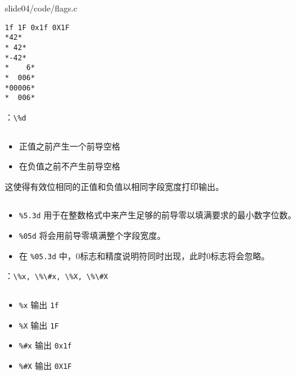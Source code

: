 \begin{frame}[fragile]\ft{\secname}
  
  {slide04/code/flags.c}    
\end{frame}

\begin{frame}[fragile]
\begin{lstlisting}[showspaces=true]
1f 1F 0x1f 0X1F
*42*
* 42*
*-42*
*    6*
*  006*
*00006*
*  006*
\end{lstlisting}
\end{frame}


\begin{frame}[fragile]{\secname：\lstinline|\%d|}

\begin{lstlisting}[backgroundcolor=\color{red!20},showspaces=true] 
% d  
\end{lstlisting}    
    \begin{itemize}
    \item 正值之前产生一个前导空格\\[0.05in]
    \item 在负值之前不产生前导空格\\[0.05in]
    \end{itemize}
    这使得有效位相同的正值和负值以相同字段宽度打印输出。 \vspace{.1in}\pause 

\begin{lstlisting}[backgroundcolor=\color{red!20}] 
%m.nd, %0md, %0m.nd
\end{lstlisting}     
    \begin{itemize}
    \item\lstinline|%5.3d| 用于在整数格式中来产生足够的前导零以填满要求的最小数字位数。\\[0.05in]
    \item \lstinline|%05d| 将会用前导零填满整个字段宽度。\\[0.05in]
    \item 在 \lstinline|%05.3d| 中，0标志和精度说明符同时出现，此时0标志将会忽略。
    \end{itemize}
\end{frame}

\begin{frame}[fragile]{\secname：\lstinline|\%x, \%\#x, \%X, \%\#X|}
\begin{lstlisting}[backgroundcolor=\color{red!20}] 
%x, %#x, %X, %#X
\end{lstlisting}
    \begin{itemize}
    \item \lstinline|%x| 输出 \lstinline|1f| \\[0.05in]
    \item \lstinline|%X| 输出 \lstinline|1F| \\[0.05in]
    \item \lstinline|%#x| 输出 \lstinline|0x1f| \\[0.05in]
    \item \lstinline|%#X| 输出 \lstinline|0X1F|
    \end{itemize}
\end{frame}


